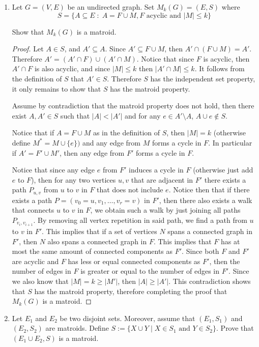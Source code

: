 \documentclass[12pt]{article}
\begin{document}
\begin{enumerate}
\begin{proof}
    \end{proof}
    
    \item Let $G = (V,E)$ be an undirected graph. Set $M_k(G) = (E,S)$ where 
    $$ S = \{ A \subseteq E \; : \; A=F \cup M, F \textrm{ acyclic and }\vert M \vert \leq k\}$$
    
        Show that $M_k(G)$ is a matroid.
    \begin{proof}
    Let $A \in S$, and $A' \subseteq A$. Since $A' \subseteq F \cup M$, then $A' \cap (F \cup M) = A'$. Therefore $A' = (A' \cap F) \cup (A'\cap M)$. Notice that since $F$ is acyclic, then $A' \cap F$ is also acyclic, and since $\vert M \vert \leq k$ then $\vert A' \cap M \vert \leq k$. It follows from the definition of $S$ that $A' \in S$. Therefore $S$ has the independent set property, it only remains to show that $S$ has the matroid property.
    
    Assume by contradiction that the matroid property does not hold, then there exist $A, A' \in S$ such that $\vert A \vert < \vert A' \vert$ and for any $e \in A' \setminus A$, $A \cup e \notin S$.
    
    Notice that if $A = F \cup M$ as in the definition of $S$, then $\vert M \vert = k$ (otherwise define $M^*= M \cup \{e\})$ and any edge from $M$ forms a cycle in $F$. In particular if $A' = F' \cup M'$, then any edge from $F'$ forms a cycle in $F$.
    
    Notice that since any edge $e$ from $F'$ induces a cycle in $F$ (otherwise just add $e$ to $F$), then for any two vertices $u,v$ that are adjacent in $F'$ there exists a path $P_{u,v}$ from $u$ to $v$ in $F$ that does not include $e$. Notice then that if there exists a path $P =(v_0 =u, v_1, \ldots, v_r = v)$ in $F'$, then there also exists a walk that connects $u$ to $v$ in $F$, we obtain such a walk by just joining all paths $P_{v_i,v_{i+1}}$. By removing all vertex repetition in said path, we find a path from $u$ to $v$ in $F'$. This implies that if a set of vertices $N$ spans a connected graph in $F'$, then $N$ also spans a connected graph in $F$. This implies that $F$ has at most the same amount of connected components as $F'$. Since both $F$ and $F'$ are acyclic and $F$ has less or equal connected components as $F'$, then the number of edges in $F$ is greater or equal to the number of edges in $F'$. Since we also know that $\vert M \vert = k \geq \vert M' \vert$, then $\vert A \vert \geq \vert A' \vert$. This contradiction shows that $S$ has the matroid property, therefore completing the proof that $M_k(G)$ is a matroid.
    \end{proof}
    \item Let $E_1$ and $E_2$ be two disjoint sets. Moreover, assume that $(E_1,S_1)$ and $(E_2,S_2)$ are matroids. Define $S:= \{ X \cup Y \; \vert \; X \in S_1 \textrm{ and } Y \in S_2 \} $. Prove that $(E_1 \cup E_2, S)$ is a matroid.
    

\end{enumerate}
\end{document}
